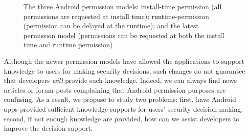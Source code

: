 \begin{figure}[h]
\centering
{} \hskip 40pt
 \hskip 40pt
\caption{The three Android permission models: install-time permission (all permissions are requested at install time); runtime-permission (permission can be delayed at the runtime); and the latest permission model (permissions can be requested at both the install time and runtime permission)}
\end{figure}

Although the newer permission models have allowed the applications to support knowledge to users for making security decisions, such changes do not guarantee that developers \emph{will} provide such knowledge. Indeed, we can always find news articles or forum posts complaining that Android permission purposes are confusing. As a result, we propose to study two problems: first, have Android apps provided sufficient knowledge supports for users' security decision making; second, if not enough knowledge are provided, how can we assist developers to improve the decision support. 

